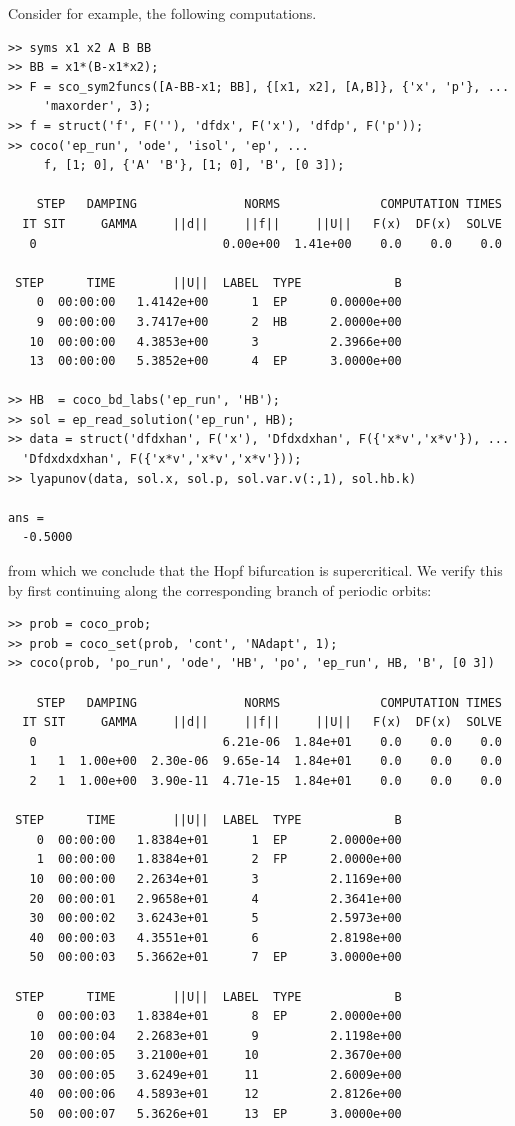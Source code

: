 Consider for example, the following computations.
\begin{lstlisting}[language=coco-highlight,frame=lines]
>> syms x1 x2 A B BB
>> BB = x1*(B-x1*x2);
>> F = sco_sym2funcs([A-BB-x1; BB], {[x1, x2], [A,B]}, {'x', 'p'}, ...
     'maxorder', 3);
>> f = struct('f', F(''), 'dfdx', F('x'), 'dfdp', F('p'));
>> coco('ep_run', 'ode', 'isol', 'ep', ...
     f, [1; 0], {'A' 'B'}, [1; 0], 'B', [0 3]);

    STEP   DAMPING               NORMS              COMPUTATION TIMES
  IT SIT     GAMMA     ||d||     ||f||     ||U||   F(x)  DF(x)  SOLVE
   0                          0.00e+00  1.41e+00    0.0    0.0    0.0

 STEP      TIME        ||U||  LABEL  TYPE             B
    0  00:00:00   1.4142e+00      1  EP      0.0000e+00
    9  00:00:00   3.7417e+00      2  HB      2.0000e+00
   10  00:00:00   4.3853e+00      3          2.3966e+00
   13  00:00:00   5.3852e+00      4  EP      3.0000e+00
   
>> HB  = coco_bd_labs('ep_run', 'HB');
>> sol = ep_read_solution('ep_run', HB);
>> data = struct('dfdxhan', F('x'), 'Dfdxdxhan', F({'x*v','x*v'}), ...
  'Dfdxdxdxhan', F({'x*v','x*v','x*v'}));
>> lyapunov(data, sol.x, sol.p, sol.var.v(:,1), sol.hb.k)

ans =
  -0.5000
\end{lstlisting}
from which we conclude that the Hopf bifurcation is supercritical. We verify this by first continuing along the corresponding branch of periodic orbits:
\begin{lstlisting}[language=coco-highlight,frame=lines]
>> prob = coco_prob;
>> prob = coco_set(prob, 'cont', 'NAdapt', 1);
>> coco(prob, 'po_run', 'ode', 'HB', 'po', 'ep_run', HB, 'B', [0 3])

    STEP   DAMPING               NORMS              COMPUTATION TIMES
  IT SIT     GAMMA     ||d||     ||f||     ||U||   F(x)  DF(x)  SOLVE
   0                          6.21e-06  1.84e+01    0.0    0.0    0.0
   1   1  1.00e+00  2.30e-06  9.65e-14  1.84e+01    0.0    0.0    0.0
   2   1  1.00e+00  3.90e-11  4.71e-15  1.84e+01    0.0    0.0    0.0

 STEP      TIME        ||U||  LABEL  TYPE             B
    0  00:00:00   1.8384e+01      1  EP      2.0000e+00
    1  00:00:00   1.8384e+01      2  FP      2.0000e+00
   10  00:00:00   2.2634e+01      3          2.1169e+00
   20  00:00:01   2.9658e+01      4          2.3641e+00
   30  00:00:02   3.6243e+01      5          2.5973e+00
   40  00:00:03   4.3551e+01      6          2.8198e+00
   50  00:00:03   5.3662e+01      7  EP      3.0000e+00

 STEP      TIME        ||U||  LABEL  TYPE             B
    0  00:00:03   1.8384e+01      8  EP      2.0000e+00
   10  00:00:04   2.2683e+01      9          2.1198e+00
   20  00:00:05   3.2100e+01     10          2.3670e+00
   30  00:00:05   3.6249e+01     11          2.6009e+00
   40  00:00:06   4.5893e+01     12          2.8126e+00
   50  00:00:07   5.3626e+01     13  EP      3.0000e+00
\end{lstlisting}
